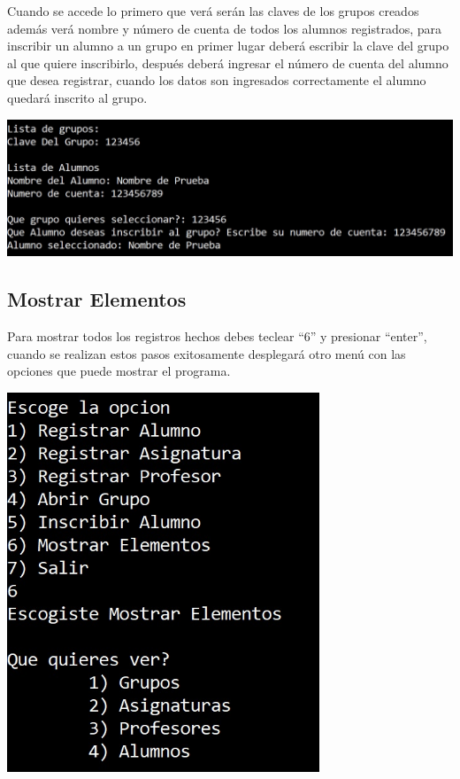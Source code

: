 \documentclass[12pt]{report}
\begin{document}
Cuando se accede lo primero que verá serán las claves de los grupos creados además verá nombre y número de cuenta de todos los alumnos registrados, para inscribir un alumno a un grupo en primer lugar deberá escribir la clave del grupo al que quiere inscribirlo, después deberá ingresar el número de cuenta del alumno que desea registrar, cuando los datos son ingresados correctamente el alumno quedará inscrito al grupo.

\begin{center}
    \includegraphics[width=1\textwidth]{img/Opcion 5 P2.jpg}
\end{center}


\newpage
\subsection*{Mostrar Elementos}
Para mostrar todos los registros hechos debes teclear ``6'' y presionar ``enter'', cuando se realizan estos pasos exitosamente desplegará otro menú con las opciones que puede mostrar el programa.

\begin{center}
    \includegraphics[width=0.7\textwidth]{img/Opcion 6 P1.jpg}
\end{center}
\end{document}
